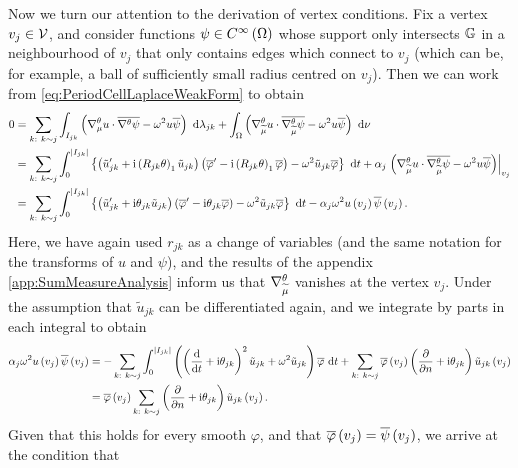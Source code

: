 Now we turn our attention to the derivation of vertex conditions.
Fix a vertex $v_j\in \mathcal{V}$, and consider functions $\psi\in C^{\infty}\left( \Omega \right)$ whose support only intersects $\mathbb{G}$ in a neighbourhood of $v_j$ that only contains edges which connect to $v_j$ (which can be, for example, a ball of sufficiently small radius centred on $v_j$).
Then we can work from \eqref{eq:PeriodCellLaplaceWeakForm} to obtain
\begin{align*}
	0 &= \sum_{k: \ k\sim j} \int_{I_{jk}} \left(  \nabla^{\theta}_\mu u \cdot \overline{\nabla^{\theta}\psi} - \omega^2 u\overline{\psi}  \right)  \ \mathrm{d}\lambda_{jk} 
	+ \int_{\Omega} \left(  \nabla^{\theta}_{\widetilde{\mu}}u\cdot\overline{\nabla^{\theta}_{\widetilde{\mu}}\psi}-\omega^2 u\overline{\psi}  \right)  \ \mathrm{d}\nu \\
	&= \sum_{k: \ k\sim j} \int_{0}^{\left\lvert I_{jk} \right\rvert} \left\{  \left( \tilde{u}_{jk}' + \mathrm{i}\left( R_{jk}\theta \right)_1 \tilde{u}_{jk} \right)\left( \overline{\varphi}' - \mathrm{i}\left( R_{jk}\theta \right)_1 \overline{\varphi}  \right) - \omega^2 \tilde{u}_{jk}\overline{\varphi}  \right\} \ \mathrm{d} t
	+ \alpha_j\left.\left(  \nabla^{\theta}_{\widetilde{\mu}}u\cdot\overline{\nabla^{\theta}_{\widetilde{\mu}}\psi}-\omega^2 u\overline{\psi}  \right)\right\vert_{v_j} \\
	&= \sum_{k: \ k\sim j} \int_{0}^{\left\lvert I_{jk} \right\rvert} \left\{  \left( \tilde{u}_{jk}' + \mathrm{i}\theta_{jk} \tilde{u}_{jk} \right)\left( \overline{\varphi}' - \mathrm{i}\theta_{jk} \overline{\varphi}  \right) - \omega^2 \tilde{u}_{jk}\overline{\varphi}  \right\} \ \mathrm{d} t
	 - \alpha_j \omega^2 u\left( v_j \right)\overline{\psi}\left( v_j \right).
\end{align*}
Here, we have again used $r_{jk}$ as a change of variables (and the same notation for the transforms of $u$ and $\psi$), and the results of the appendix \ref{app:SumMeasureAnalysis} inform us that $\nabla^{\theta}_{\widetilde{\mu}}$ vanishes at the vertex $v_j$.
Under the assumption that $\tilde{u}_{jk}$ can be differentiated again, and we integrate by parts in each integral to obtain
\begin{align*}
	\alpha_j\omega^2 u\left( v_j \right)\overline{\psi}\left( v_j \right) 
	&= - \sum_{k: \ k\sim j} \int_{0}^{\left\lvert I_{jk} \right\rvert} \left(  \left( \dfrac{\mathrm{d}}{\mathrm{d}t} + \mathrm{i}\theta_{jk} \right)^2 \tilde{u}_{jk} +\omega^2 \tilde{u}_{jk}  \right)\overline{\varphi} \ \mathrm{d} t
	+ \sum_{k: \ k\sim j}\overline{\varphi}\left( v_j \right)\left( \dfrac{\partial }{\partial n} + \mathrm{i}\theta_{jk} \right)\tilde{u}_{jk}\left( v_j \right) \\
	&= \overline{\varphi}\left( v_j \right)\sum_{k: \ k\sim j}\left( \dfrac{\partial }{\partial n} + \mathrm{i}\theta_{jk} \right)\tilde{u}_{jk}\left( v_j \right).
\end{align*}
Given that this holds for every smooth $\varphi$, and that $\overline{\varphi}\left( v_j \right)=\overline{\psi}\left( v_j \right)$, we arrive at the condition that
